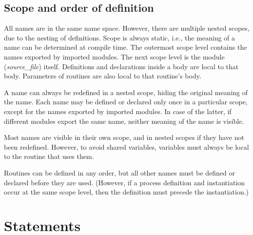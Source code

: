
\subsection{Scope and order of definition}\label{sec:scope}

All names are in the same name space.
However, there are multiple nested scopes, due to the nesting of
definitions. Scope is always static, i.e.,
the meaning of a name can be determined at compile time. The outermost
scope level contains the names exported by imported modules. The next
scope level is the module ({\it{}source\_file}) itself. Definitions and
declarations
inside a body are local to that body. Parameters of routines are also
local to that routine's body.

A name can always be redefined in a nested scope, hiding the original
meaning of the name. Each name may be defined or declared only once in
a particular scope, except for the names exported by imported modules.
In case of the latter, if different modules export the same name, neither
meaning of the name is visible.

Most names are visible in their own scope, and in nested scopes if they
have not been redefined. However, to avoid shared variables, variables
must always be local to the routine that uses them.

Routines can be defined in any order, but all other names must be
defined or declared before they are used. (However, if a process definition
and instantiation occur at the same scope level, then the definition must
precede the instantiation.)



\section{Statements}\label{sec:statements}

